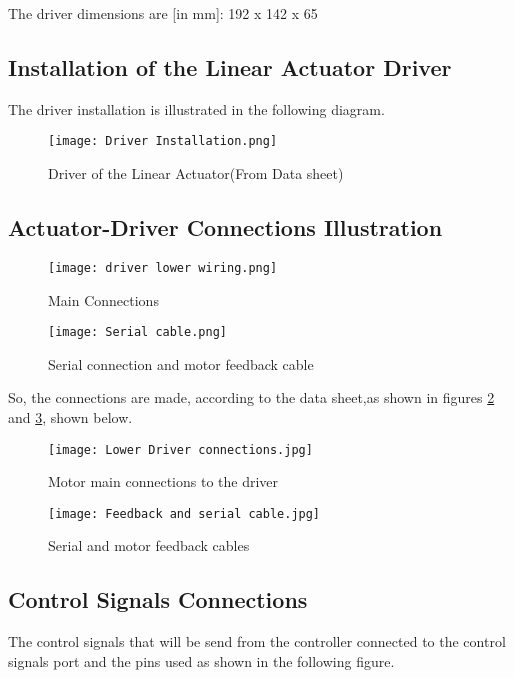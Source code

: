 The driver dimensions are [in mm]: 192 x 142 x 65
\subsection{Installation of the Linear Actuator Driver}
The driver installation is illustrated in the following diagram.
\begin{figure}[H]
    \centering
    \texttt{[image: Driver Installation.png]}
    \caption{Driver of the Linear Actuator(From Data sheet)}
    \label{fig:Driver}
    
\end{figure}

\subsection{Actuator-Driver Connections Illustration}
\begin{figure}[H]
    \centering
    \texttt{[image: driver lower wiring.png]}
    \caption{Main Connections}
    \label{fig:Main Connections}
    
\end{figure}
\begin{figure}[H]
    \centering
    \texttt{[image: Serial cable.png]}
    \caption{Serial connection and motor feedback cable}
    \label{fig:Serial connection}
    
\end{figure}
\newpage
So, the connections are made, according to the data sheet,as shown in figures \ref{fig:Main Connections} and \ref{fig:Serial connection}, shown below.
\begin{figure}[H]
    \centering
    \texttt{[image: Lower Driver connections.jpg]}
    \caption{Motor main connections to the driver}
    \label{fig:Connections}
    
\end{figure}

\begin{figure}[H]
    \centering
    \texttt{[image: Feedback and serial cable.jpg]}
    \caption{Serial and motor feedback cables}
    \label{fig:serialConnections}
    
\end{figure}
\newpage
\subsection{Control Signals Connections}
The control signals that will be send from the controller connected to the control signals port and the pins used as shown in the following figure.

